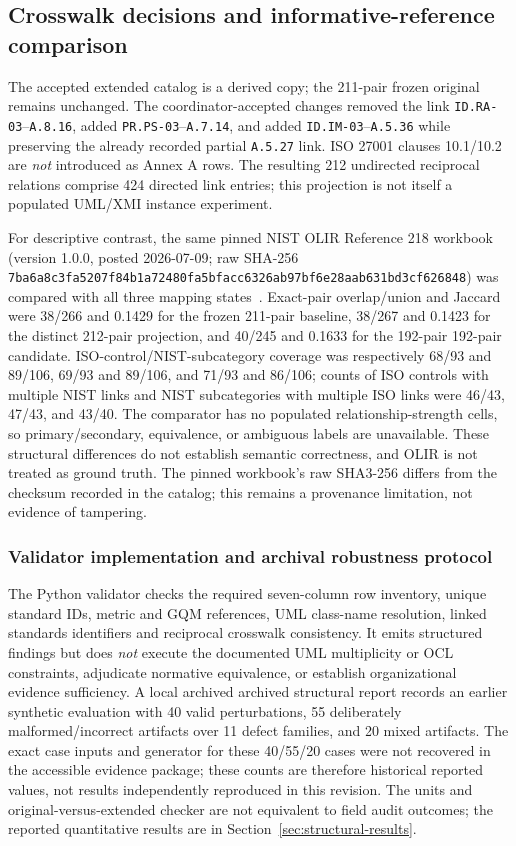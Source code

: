 \documentclass[12pt,a4paper]{article}
\begin{document}
\subsection{Crosswalk decisions and informative-reference comparison}
The accepted extended catalog is a derived copy; the 211-pair frozen original remains unchanged. The coordinator-accepted changes removed the link \texttt{ID.RA-03}--\texttt{A.8.16}, added \texttt{PR.PS-03}--\texttt{A.7.14}, and added \texttt{ID.IM-03}--\texttt{A.5.36} while preserving the already recorded partial \texttt{A.5.27} link. ISO 27001 clauses 10.1/10.2 are \emph{not} introduced as Annex A rows. The resulting 212 undirected reciprocal relations comprise 424 directed link entries; this projection is not itself a populated UML/XMI instance experiment.

For descriptive contrast, the same pinned NIST OLIR Reference 218 workbook (version 1.0.0, posted 2026-07-09; raw SHA-256 \texttt{7ba6a8c3\allowbreak fa5207f8\allowbreak 4b1a7248\allowbreak 0fa5bfac\allowbreak c6326ab9\allowbreak 7bf6e28a\allowbreak ab631bd3\allowbreak cf626848}) was compared with all three mapping states~\cite{NIST_OLIR_218}. Exact-pair overlap/union and Jaccard were 38/266 and 0.1429 for the frozen 211-pair baseline, 38/267 and 0.1423 for the distinct 212-pair projection, and 40/245 and 0.1633 for the 192-pair 192-pair candidate. ISO-control/NIST-subcategory coverage was respectively 68/93 and 89/106, 69/93 and 89/106, and 71/93 and 86/106; counts of ISO controls with multiple NIST links and NIST subcategories with multiple ISO links were 46/43, 47/43, and 43/40. The comparator has no populated relationship-strength cells, so primary/secondary, equivalence, or ambiguous labels are unavailable. These structural differences do not establish semantic correctness, and OLIR is not treated as ground truth. The pinned workbook's raw SHA3-256 differs from the checksum recorded in the catalog; this remains a provenance limitation, not evidence of tampering.


\subsubsection{Validator implementation and archival robustness protocol}
\label{sec:validator}
The Python validator checks the required seven-column row inventory, unique standard IDs, metric and GQM references, UML class-name resolution, linked standards identifiers and reciprocal crosswalk consistency. It emits structured findings but does \emph{not} execute the documented UML multiplicity or OCL constraints, adjudicate normative equivalence, or establish organizational evidence sufficiency. A local archived archived structural report records an earlier synthetic evaluation with 40 valid perturbations, 55 deliberately malformed/incorrect artifacts over 11 defect families, and 20 mixed artifacts. The exact case inputs and generator for these 40/55/20 cases were not recovered in the accessible evidence package; these counts are therefore historical reported values, not results independently reproduced in this revision. The units and original-versus-extended checker are not equivalent to field audit outcomes; the reported quantitative results are in Section~\ref{sec:structural-results}.
\end{document}
